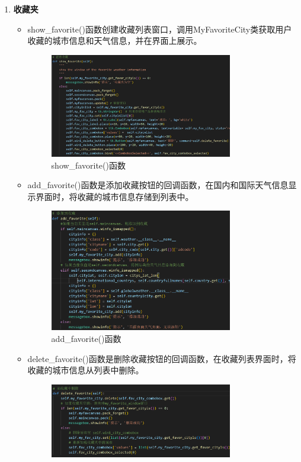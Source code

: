 \documentclass[UTF8]{ctexart}
\begin{document}
\begin{enumerate}
   \item \textbf{收藏夹}
   \begin{itemize}
      \item show\_favorite()函数创建收藏列表窗口，调用MyFavoriteCity类获取用户收藏的城市信息和天气信息，并在界面上展示。
      \begin{figure}[H]
         \centering
         \includegraphics[width=0.8\textwidth]{pica1.png}
         \caption{show\_favorite()函数}
      \end{figure}
      \item add\_favorite()函数是添加收藏按钮的回调函数，在国内和国际天气信息显示界面时，将收藏的城市信息存储到列表中。
      \begin{figure}[H]
         \centering
         \includegraphics[width=0.8\textwidth]{pica2.png}
         \caption{add\_favorite()函数}
      \end{figure}
      \item delete\_favorite()函数是删除收藏按钮的回调函数，在收藏列表界面时，将收藏的城市信息从列表中删除。
      \begin{figure}[H]
         \centering
         \includegraphics[width=0.8\textwidth]{pica3.png}

\end{figure}
\end{itemize}
\end{enumerate}
\end{document}
